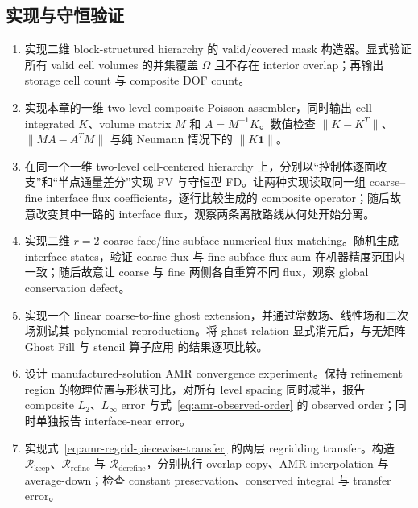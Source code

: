 \subsection*{实现与守恒验证}
\begin{enumerate}[label=\arabic*.]
\item 实现二维 block-structured hierarchy 的 valid/covered mask 构造器。显式验证所有 valid cell volumes 的并集覆盖 $\Omega$ 且不存在 interior overlap；再输出 storage cell count 与 composite DOF count。
\item 实现本章的一维 two-level composite Poisson assembler，同时输出 cell-integrated $K$、volume matrix $M$ 和 $A=M^{-1}K$。数值检查 $\|K-K^T\|$、$\|MA-A^TM\|$ 与纯 Neumann 情况下的 $\|K\bm1\|$。
\item 在同一个一维 two-level cell-centered hierarchy 上，分别以“控制体逐面收支”和“半点通量差分”实现 FV 与守恒型 FD。让两种实现读取同一组 coarse--fine interface flux coefficients，逐行比较生成的 composite operator；随后故意改变其中一路的 interface flux，观察两条离散路线从何处开始分离。
\item 实现二维 $r=2$ coarse-face/fine-subface numerical flux matching。随机生成 interface states，验证 coarse flux 与 fine subface flux sum 在机器精度范围内一致；随后故意让 coarse 与 fine 两侧各自重算不同 flux，观察 global conservation defect。
\item 实现一个 linear coarse-to-fine ghost extension，并通过常数场、线性场和二次场测试其 polynomial reproduction。将 ghost relation 显式消元后，与无矩阵 Ghost Fill 与 stencil 算子应用 的结果逐项比较。
\item 设计 manufactured-solution AMR convergence experiment。保持 refinement region 的物理位置与形状可比，对所有 level spacing 同时减半，报告 composite $L_2$、$L_\infty$ error 与式~\eqref{eq:amr-observed-order} 的 observed order；同时单独报告 interface-near error。
\item 实现式~\eqref{eq:amr-regrid-piecewise-transfer} 的两层 regridding transfer。构造 $\mathcal R_{\mathrm{keep}}$、$\mathcal R_{\mathrm{refine}}$ 与 $\mathcal R_{\mathrm{derefine}}$，分别执行 overlap copy、AMR interpolation 与 average-down；检查 constant preservation、conserved integral 与 transfer error。
\end{enumerate}

